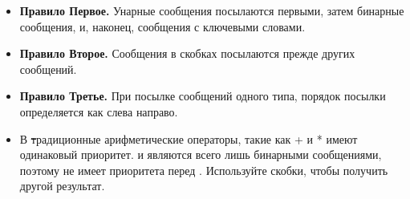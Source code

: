 \documentclass[a4paper,10pt,twoside]{book}
\begin{document}
\begin{itemize}
\item \textbf{Правило Первое.} Унарные сообщения посылаются первыми, затем бинарные сообщения, и, наконец, сообщения с ключевыми словами.
\item \textbf{Правило Второе.} Сообщения в скобках посылаются прежде других сообщений.
\item \textbf{Правило Третье.} При посылке сообщений одного типа, порядок посылки определяется как слева направо.
\item В \st традиционные арифметические операторы, такие как + и * имеют одинаковый приоритет. \ct{+} и \ct{*} являются всего лишь бинарными сообщениями, поэтому \ct{*} не имеет приоритета перед \ct{+}. Используйте скобки, чтобы получить другой результат.
\end{itemize}

\ifx\wholebook\relax\else
\end{document}
